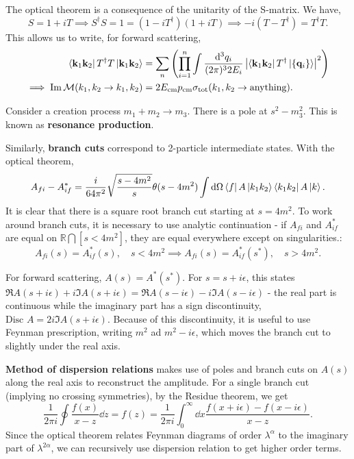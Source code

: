 \documentclass{article}
\begin{document}
The optical theorem is a consequence of the unitarity of the S-matrix. We have, 
\begin{equation}
    S=1+iT\implies S^\dag S=1=(1-iT^\dag)(1+iT)\implies -i(T-T^\dag)=T^\dag T.
\end{equation}
This allows us to write, for forward scattering,
\begin{align*}
    \bra{\mathbf k_1\mathbf k_2}T^\dag T\ket{\mathbf k_1\mathbf k_2}&=\sum_n\left(\prod^n_{i=1}\int\frac{\dd^3q_i}{(2\pi)^32E_i}\left\lvert\bra{\mathbf k_1\mathbf k_2}T^\dag\ket{\{\mathbf q_i\}}\right\rvert^2\right)\\
    \implies \Im \mathcal M(k_1,k_2\to k_1,k_2)&=2E_\text{cm}p_\text{cm}\sigma_\text{tot}(k_1,k_2\to\text{anything}).
\end{align*}

\example Consider a creation process $m_1+m_2\to m_3$. There is a pole at $s^2-m_3^2$. This is known as \textbf{resonance production}.

Similarly, \textbf{branch cuts} correspond to 2-particle intermediate states. With the optical theorem, 
$$A_{fi}-A^*_{if}=\frac i{64\pi^2}\sqrt{\frac{s-4m^2}s}\theta(s-4m^2)\int\dd\Omega\bra fA\ket{k_1k_2}\bra{k_1k_2}A\ket k.$$
It is clear that there is a square root branch cut starting at $s=4m^2$. To work around branch cuts, it is necessary to use analytic continuation - if $A_{fi}$ and $A^*_{if}$ are equal on $\mathbb R\bigcap [s<4m^2]$, they are equal everywhere except on singularities.:
$$A_{fi}(s)=A^*_{if}(s),\quad s<4m^2\implies A_{fi}(s)=A^*_{if}(s^*),\quad s>4m^2.$$

\example For forward scattering, $A(s)=A^*(s^*)$. For $s=s+i\epsilon$, this states $\Re A(s+i\epsilon)+i\Im A(s+i\epsilon)=\Re A(s-i\epsilon)-i\Im A(s-i\epsilon)$ - the real part is continuous while the imaginary part has a sign discontinuity, $\text{Disc }A=2i\Im A(s+i\epsilon)$. Because of this discontinuity, it is useful to use Feynman prescription, writing $m^2$ ad $m^2-i\epsilon$, which moves the branch cut to slightly under the real axis. 

\textbf{Method of dispersion relations} makes use of poles and branch cuts on $A(s)$ along the real axis to reconstruct the amplitude. For a single branch cut (implying no crossing symmetries), by the Residue theorem, we get 
$$\frac 1{2\pi i}\oint\frac{f(x)}{x-z}\dd z=f(z)=\frac 1{2\pi i}\int^\infty_0\dd x\frac{f(x+i\epsilon)-f(x-i\epsilon)}{x-z}.$$
Since the optical theorem relates Feynman diagrams of order $\lambda^\alpha$ to the imaginary part of $\lambda^{2\alpha}$, we can recursively use dispersion relation to get higher order terms.
\end{document}
